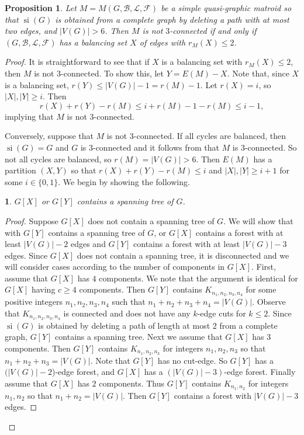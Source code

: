 \documentclass[12pt]{article}
\newtheorem{claim}{}[theorem]
\newtheorem{proposition}[theorem]{Proposition}
\theoremstyle{definition}
\theoremstyle{plain} %
\newcommand{\cB}{\mathcal{B}}
\newcommand{\cF}{\mathcal{F}}
\newcommand{\cL}{\mathcal{L}}
\DeclareMathOperator{\si}{si}
\begin{document}
\begin{proposition} \label{prop: which ones are 3-connected?}
Let $M = M(G, \cB, \cL, \cF)$ be a simple quasi-graphic matroid so that $\si(G)$ is obtained from a complete graph by deleting a path with at most two edges, and $|V(G)| > 6$.
Then $M$ is not $3$-connected if and only if $(G, \cB, \cL, \cF)$ has a balancing set $X$ of edges with $r_M(X) \le 2$.
\end{proposition}
\begin{proof}
It is straightforward to see that if $X$ is a balancing set with $r_M(X)\leq2$, then $M$ is not 3-connected. To show this, let $Y=E(M)-X$. Note that, since $X$ is a balancing set, $r(Y)\leq\lvert V(G)\rvert-1=r(M)-1$. 
Let $r(X) = i$, so $|X|, |Y| \ge i$.
Then
\[
r(X)+r(Y)-r(M)\leq i+r(M)-1-r(M)\leq i - 1,
\]
implying that $M$ is not 3-connected.

Conversely, suppose that $M$ is not $3$-connected. If all cycles are balanced, then $\si(G) = G$ and $G$ is $3$-connected and it follows from \cite[Proposition 8.1.9]{Oxley2011} that $M$ is $3$-connected. So not all cycles are balanced, so $r(M) = |V(G)| > 6$.
Then $E(M)$ has a partition $(X, Y)$ so that $r(X) + r(Y) - r(M) \le i$ and $|X|, |Y| \ge i+1$ for some $i \in \{0,1\}$. We begin by showing the following.

\begin{claim}\label{$G[X]$ or $G[Y]$ contains a spanning tree of $G$}
$G[X]$ or $G[Y]$ contains a spanning tree of $G$.
\end{claim}
\begin{proof}
Suppose $G[X]$ does not contain a spanning tree of $G$. We will show that with $G[Y]$ contains a spanning tree of $G$, or $G[X]$ contains a forest with at least $|V(G)| - 2$ edges and $G[Y]$ contains a forest with at least $|V(G)| - 3$ edges. Since $G[X]$ does not contain a spanning tree, it is disconnected and we will consider cases according to the number of components in $G[X]$. First, assume that $G[X]$ has $4$ components. We note that the argument is identical for $G[X]$ having $c\geq4$ components. Then $G[Y]$ contains $K_{n_1,n_2,n_3,n_4}$ for some positive integers $n_1,n_2,n_3,n_4$ such that $n_1+n_2+n_3+n_4=\lvert V(G)\rvert$. Observe that $K_{n_1,n_2,n_3,n_4}$ is connected and does not have any $k$-edge cuts for $k\leq2$. Since $\si(G)$ is obtained by deleting a path of length at most 2 from a complete graph, $G[Y]$ contains a spanning tree. Next we assume that $G[X]$ has $3$ components. Then $G[Y]$ contains $K_{n_1,n_2,n_3}$ for integers $n_1,n_2,n_3$ so that $n_1+n_2+n_3=\lvert V(G)\rvert$. 
Note that $G[Y]$ has no cut-edge. So $G[Y]$ has a $(|V(G)|-2$)-edge forest, and $G[X]$ has a $(|V(G)|-3)$-edge forest. Finally assume that $G[X]$ has $2$ components. Thus $G[Y]$ contains $K_{n_1,n_2}$ for integers $n_1,n_2$ so that $n_1+n_2=\lvert V(G)\rvert$. Then $G[Y]$ contains a forest with $|V(G)|-3$ edges. 


\end{proof}
\end{proof}
\end{document}
